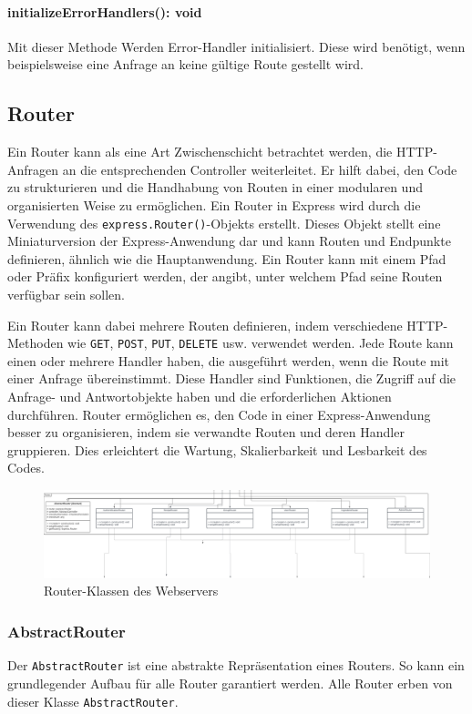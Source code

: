\documentclass[parskip=full]{scrartcl}
\begin{document}
\paragraph{initializeErrorHandlers(): void}Mit dieser Methode Werden Error-Handler initialisiert. Diese wird benötigt, wenn beispielsweise eine Anfrage an keine gültige Route gestellt wird.

\subsection{Router}
Ein Router kann als eine Art Zwischenschicht betrachtet werden, die HTTP-Anfragen an die entsprechenden Controller weiterleitet.
Er hilft dabei, den Code zu strukturieren und die Handhabung von Routen in einer modularen und organisierten Weise zu ermöglichen.
Ein Router in Express wird durch die Verwendung des \texttt{express.Router()}-Objekts erstellt.
Dieses Objekt stellt eine Miniaturversion der Express-Anwendung dar und kann Routen und Endpunkte definieren, ähnlich wie die Hauptanwendung.
Ein Router kann mit einem Pfad oder Präfix konfiguriert werden, der angibt, unter welchem Pfad seine Routen verfügbar sein sollen.

Ein Router kann dabei mehrere Routen definieren, indem verschiedene HTTP-Methoden wie \texttt{GET}, \texttt{POST}, \texttt{PUT}, \texttt{DELETE} usw. verwendet werden.
Jede Route kann einen oder mehrere Handler haben, die ausgeführt werden, wenn die Route mit einer Anfrage übereinstimmt.
Diese Handler sind Funktionen, die Zugriff auf die Anfrage- und Antwortobjekte haben und die erforderlichen Aktionen durchführen.
Router ermöglichen es, den Code in einer Express-Anwendung besser zu organisieren, indem sie verwandte Routen und deren Handler gruppieren.
Dies erleichtert die Wartung, Skalierbarkeit und Lesbarkeit des Codes.

\begin{figure}[htp]
    \centering
    \includegraphics[width = 1\textwidth]{images/webserver/router.pdf}
    \caption{Router-Klassen des Webservers}
    \label{fig:router}
\end{figure}

\subsubsection{AbstractRouter}
Der \texttt{AbstractRouter} ist eine abstrakte Repräsentation eines Routers. So kann ein grundlegender Aufbau für alle Router garantiert werden. Alle Router erben von dieser Klasse \texttt{AbstractRouter}.
\end{document}
